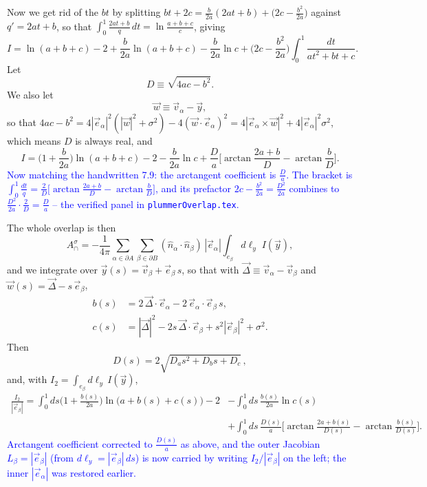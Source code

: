 \documentclass[11pt]{article}
\numberwithin{equation}{section}
\newcommand{\vv}[1]{\vec{#1}}
\newcommand{\cam}[1]{\textcolor{blue}{#1}}
\begin{document}
Now we get rid of the $bt$ by splitting $bt+2c=\tfrac{b}{2a}(2at+b)+\big(2c-\tfrac{b^2}{2a}\big)$
against $q'=2at+b$, so that $\int_0^1\tfrac{2at+b}{q}\,dt=\ln\tfrac{a+b+c}{c}$, giving
\[
  I=\ln(a+b+c)-2+\frac{b}{2a}\ln(a+b+c)-\frac{b}{2a}\ln c
   +\Big(2c-\frac{b^2}{2a}\Big)\int_0^1\frac{dt}{at^2+bt+c}.
\]
Let
\begin{equation}\label{eq:Ddef}
  D\equiv\sqrt{4ac-b^2}.
\end{equation}
We also let
\begin{equation}\label{eq:wdef}
  \vv w\equiv\vv v_\alpha-\vv y,
\end{equation}
so that $4ac-b^2=4|\vv e_\alpha|^2(|\vv w|^2+\sigma^2)-4(\vv w\cdot\vv e_\alpha)^2
=4|\vv e_\alpha\times\vv w|^2+4|\vv e_\alpha|^2\sigma^2$, which means $D$ is always
real, and
\begin{equation}\label{eq:Ipanel}
  I=\Big(1+\frac{b}{2a}\Big)\ln(a+b+c)-2-\frac{b}{2a}\ln c
    +\frac{D}{a}\Big[\arctan\frac{2a+b}{D}-\arctan\frac{b}{D}\Big].
\end{equation}
\cam{Now matching the handwritten 7.9: the arctangent coefficient is $\tfrac{D}{a}$. The bracket is
$\int_0^1\!\tfrac{dt}{q}=\tfrac{2}{D}\big[\arctan\tfrac{2a+b}{D}-\arctan\tfrac{b}{D}\big]$, and its
prefactor $2c-\tfrac{b^2}{2a}=\tfrac{D^2}{2a}$ combines to
$\tfrac{D^2}{2a}\cdot\tfrac{2}{D}=\tfrac{D}{a}$ -- the verified panel in \texttt{plummerOverlap.tex}.}

The whole overlap is then
\[
  A_\cap^\sigma=-\frac{1}{4\pi}\sum_{\alpha\in\partial A}\sum_{\beta\in\partial B}
  (\hat n_\alpha\cdot\hat n_\beta)\,|\vv e_\alpha|\int_{e_\beta}\!d\ell_y\;I(\vv y) ,
\]
and we integrate over $\vv y(s)=\vv v_\beta+\vv e_\beta\,s$, so that with $\vv\Delta\equiv\vv v_\alpha-\vv v_\beta$
and $\vv w(s)=\vv\Delta-s\,\vv e_\beta$,
\begin{equation}\label{eq:bcs}
\begin{aligned}
  b(s)&=2\,\vv\Delta\cdot\vv e_\alpha-2\,\vv e_\alpha\cdot\vv e_\beta\,s,\\
  c(s)&=|\vv\Delta|^2-2s\,\vv\Delta\cdot\vv e_\beta+s^2|\vv e_\beta|^2+\sigma^2 .
\end{aligned}
\end{equation}
Then
\begin{equation}\label{eq:Ds}
  D(s)=2\sqrt{D_a s^2+D_b s+D_c}\,,
\end{equation}
and, with $I_2=\int_{e_\beta}d\ell_y\,I(\vv y)$,
\begin{equation}\label{eq:I2}
\begin{aligned}
  \frac{I_2}{|\vv e_\beta|}=\int_0^1\!ds\Big(1+\frac{b(s)}{2a}\Big)\ln\!\big(a+b(s)+c(s)\big)-2
  &-\int_0^1\!ds\,\frac{b(s)}{2a}\ln c(s)\\
  &+\int_0^1\!ds\,\frac{D(s)}{a}\Big[\arctan\frac{2a+b(s)}{D(s)}-\arctan\frac{b(s)}{D(s)}\Big].
\end{aligned}
\end{equation}
\cam{Arctangent coefficient corrected to $\tfrac{D(s)}{a}$ as above, and the outer Jacobian
$L_\beta=|\vv e_\beta|$ (from $d\ell_y=|\vv e_\beta|\,ds$) is now carried by writing
$I_2/|\vv e_\beta|$ on the left; the inner $|\vv e_\alpha|$ was restored earlier.}
\end{document}
